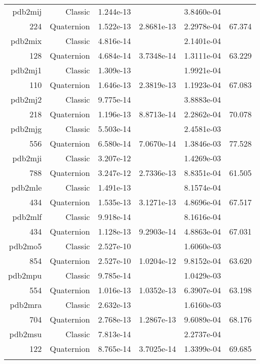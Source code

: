 \begin{xltabular}{\textwidth}{r|rS[table-format=1.3e+2]S[table-format=1.4e+2]S[table-format=1.4e+2]S[table-format=-1.3]}
pdb2mij & Classic & 1.244e-13 &  & 3.8460e-04 & \\
224 & Quaternion & 1.522e-13 & 2.8681e-13 & 2.2978e-04 & 67.374\\  \addlinespace
pdb2mix & Classic & 4.816e-14 &  & 2.1401e-04 & \\
128 & Quaternion & 4.684e-14 & 3.7348e-14 & 1.3111e-04 & 63.229\\  \addlinespace
pdb2mj1 & Classic & 1.309e-13 &  & 1.9921e-04 & \\
110 & Quaternion & 1.646e-13 & 2.3819e-13 & 1.1923e-04 & 67.083\\  \addlinespace
pdb2mj2 & Classic & 9.775e-14 &  & 3.8883e-04 & \\
218 & Quaternion & 1.196e-13 & 8.8713e-14 & 2.2862e-04 & 70.078\\  \addlinespace
pdb2mjg & Classic & 5.503e-14 &  & 2.4581e-03 & \\
556 & Quaternion & 6.580e-14 & 7.0670e-14 & 1.3846e-03 & 77.528\\  \addlinespace
pdb2mji & Classic & 3.207e-12 &  & 1.4269e-03 & \\
788 & Quaternion & 3.247e-12 & 2.7336e-13 & 8.8351e-04 & 61.505\\  \addlinespace
pdb2mle & Classic & 1.491e-13 &  & 8.1574e-04 & \\
434 & Quaternion & 1.535e-13 & 3.1271e-13 & 4.8696e-04 & 67.517\\  \addlinespace
pdb2mlf & Classic & 9.918e-14 &  & 8.1616e-04 & \\
434 & Quaternion & 1.128e-13 & 9.2903e-14 & 4.8863e-04 & 67.031\\  \addlinespace
pdb2mo5 & Classic & 2.527e-10 &  & 1.6060e-03 & \\
854 & Quaternion & 2.527e-10 & 1.0204e-12 & 9.8152e-04 & 63.620\\  \addlinespace
pdb2mpu & Classic & 9.785e-14 &  & 1.0429e-03 & \\
554 & Quaternion & 1.016e-13 & 1.0352e-13 & 6.3907e-04 & 63.198\\  \addlinespace
pdb2mra & Classic & 2.632e-13 &  & 1.6160e-03 & \\
704 & Quaternion & 2.768e-13 & 1.2867e-13 & 9.6089e-04 & 68.176\\  \addlinespace
pdb2msu & Classic & 7.813e-14 &  & 2.2737e-04 & \\
122 & Quaternion & 8.765e-14 & 3.7025e-14 & 1.3399e-04 & 69.685\\  \addlinespace

\end{xltabular}

